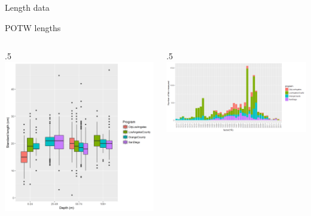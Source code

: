 \documentclass[ignorenonframetext,]{beamer}
\def\begincols{\begin{columns}}
\def\begincol{\begin{column}}
\def\endcol{\end{column}}
\def\endcols{\end{columns}}
\begin{document}
\begin{frame}{Length data}

POTW lengths \begincols
 \begincol{.5\textwidth}
\includegraphics[height=.5\textheight]{Figures/Fleet7_Sanitation_lengthboxplots.png}
\endcol
 \begincol{.5\textwidth}
\includegraphics[height=.5\textheight]{Figures/Fleet7_Sanitation_length_source.png}\\
\endcol
\endcols

\end{frame}
\end{document}
